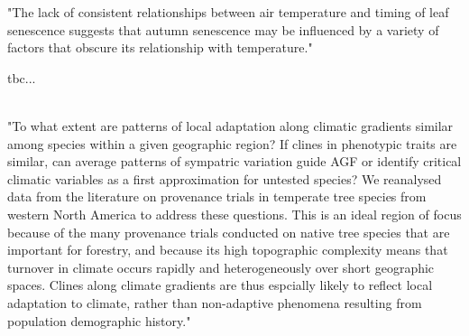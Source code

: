\documentclass{article}
\begin{document}
"The lack of consistent relationships between air temperature and timing of leaf senescence suggests that autumn senescence may be influenced by a variety of factors that obscure its relationship with temperature."



tbc...

 
 

\citep{AitkenBemmels16}\\
"To what extent are patterns of local adaptation along climatic gradients similar among species within a given geographic region? If clines in phenotypic traits are similar, can average patterns of sympatric variation guide AGF or identify critical climatic variables as a first approximation for untested species? We reanalysed data from the literature on provenance trials in temperate tree species from western North America to address these questions. This is an ideal region of focus because of the many provenance trials conducted on native tree species that are important for forestry, and because its high topographic complexity means that turnover in climate occurs rapidly and heterogeneously over short geographic spaces. Clines along climate gradients are thus espcially likely to reflect local adaptation to climate, rather than non-adaptive phenomena resulting from population demographic history."
\\

\end{document}
